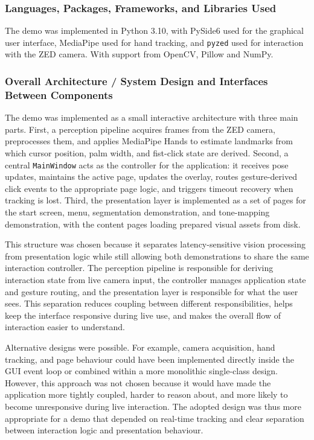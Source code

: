 ﻿\documentclass[11pt,a4paper]{article}
\begin{document}
\subsubsection{Languages, Packages, Frameworks, and Libraries Used}

The demo was implemented in Python 3.10, with PySide6 used for the graphical
user interface, MediaPipe used for hand tracking, and \texttt{pyzed} used for
interaction with the ZED camera. With support from OpenCV, Pillow and NumPy.

\subsubsection{Overall Architecture / System Design and Interfaces Between Components}

The demo was implemented as a small interactive architecture with three main
parts. First, a perception pipeline acquires frames from the ZED camera,
preprocesses them, and applies MediaPipe Hands to estimate landmarks from
which cursor position, palm width, and fist-click state are derived. Second,
a central \texttt{MainWindow} acts as the controller for the application: it
receives pose updates, maintains the active page, updates the overlay, routes
gesture-derived click events to the appropriate page logic, and triggers
timeout recovery when tracking is lost. Third, the presentation layer is
implemented as a set of pages for the start screen, menu, segmentation
demonstration, and tone-mapping demonstration, with the content pages loading
prepared visual assets from disk.

\medskip

\noindent
This structure was chosen because it separates latency-sensitive vision
processing from presentation logic while still allowing both demonstrations to
share the same interaction controller. The perception pipeline is responsible
for deriving interaction state from live camera input, the controller manages
application state and gesture routing, and the presentation layer is
responsible for what the user sees. This separation reduces coupling between
different responsibilities, helps keep the interface responsive during live
use, and makes the overall flow of interaction easier to understand.

\medskip

\noindent
Alternative designs were possible. For example, camera acquisition, hand
tracking, and page behaviour could have been implemented directly inside the
GUI event loop or combined within a more monolithic single-class design.
However, this approach was not chosen because it would have made the
application more tightly coupled, harder to reason about, and more likely to
become unresponsive during live interaction. The adopted design was thus more
appropriate for a demo that depended on real-time tracking and clear
separation between interaction logic and presentation behaviour.
\end{document}
